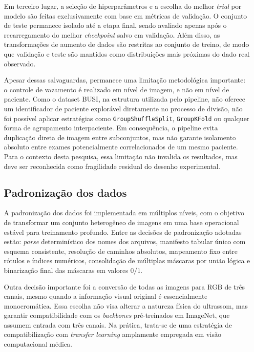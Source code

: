 \documentclass[tcc,capa]{texufpel}
\begin{document}
Em terceiro lugar, a seleção de hiperparâmetros e a escolha do melhor \textit{trial} por modelo são feitas exclusivamente com base em métricas de validação. O conjunto de teste permanece isolado até a etapa final, sendo avaliado apenas após o recarregamento do melhor \textit{checkpoint} salvo em validação. Além disso, as transformações de aumento de dados são restritas ao conjunto de treino, de modo que validação e teste são mantidos como distribuições mais próximas do dado real observado.

Apesar dessas salvaguardas, permanece uma limitação metodológica importante: o controle de vazamento é realizado em nível de imagem, e não em nível de paciente. Como o dataset BUSI, na estrutura utilizada pelo pipeline, não oferece um identificador de paciente explorável diretamente no processo de divisão, não foi possível aplicar estratégias como \texttt{GroupShuffleSplit}, \texttt{GroupKFold} ou qualquer forma de agrupamento interpaciente. Em consequência, o pipeline evita duplicação direta de imagem entre subconjuntos, mas não garante isolamento absoluto entre exames potencialmente correlacionados de um mesmo paciente. Para o contexto desta pesquisa, essa limitação não invalida os resultados, mas deve ser reconhecida como fragilidade residual do desenho experimental.

\subsection{Padronização dos dados}

A padronização dos dados foi implementada em múltiplos níveis, com o objetivo de transformar um conjunto heterogêneo de imagens em uma base operacional estável para treinamento profundo. Entre as decisões de padronização adotadas estão: \textit{parse} determinístico dos nomes dos arquivos, manifesto tabular único com esquema consistente, resolução de caminhos absolutos, mapeamento fixo entre rótulos e índices numéricos, consolidação de múltiplas máscaras por união lógica e binarização final das máscaras em valores \(0/1\).

Outra decisão importante foi a conversão de todas as imagens para RGB de três canais, mesmo quando a informação visual original é essencialmente monocromática. Essa escolha não visa alterar a natureza física do ultrassom, mas garantir compatibilidade com os \textit{backbones} pré-treinados em ImageNet, que assumem entrada com três canais. Na prática, trata-se de uma estratégia de compatibilização com \textit{transfer learning} amplamente empregada em visão computacional médica.
\end{document}

